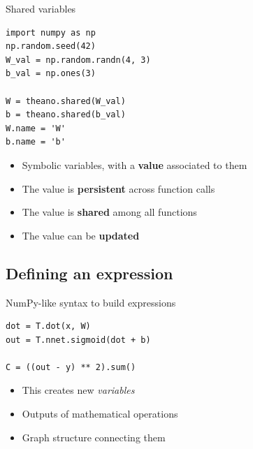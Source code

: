 \documentclass[a4paper,9pt]{beamer}
\begin{document}
\begin{frame}[fragile]{Shared variables}
  \begin{verbatim}
import numpy as np
np.random.seed(42)
W_val = np.random.randn(4, 3)
b_val = np.ones(3)

W = theano.shared(W_val)
b = theano.shared(b_val)
W.name = 'W'
b.name = 'b'
  \end{verbatim}
  \begin{itemize}
    \item Symbolic variables, with a \textbf{value} associated to them
    \item The value is \textbf{persistent} across function calls
    \item The value is \textbf{shared} among all functions
    \item The value can be \textbf{updated}
  \end{itemize}
\end{frame}

\subsection{Defining an expression}
\begin{frame}[fragile]{NumPy-like syntax to build expressions}
  \begin{verbatim}
dot = T.dot(x, W)
out = T.nnet.sigmoid(dot + b)

C = ((out - y) ** 2).sum()
  \end{verbatim}

  \begin{itemize}
    \item This creates new \emph{variables}
    \item Outputs of mathematical operations
    \item Graph structure connecting them
  \end{itemize}
\end{frame}
\end{document}
